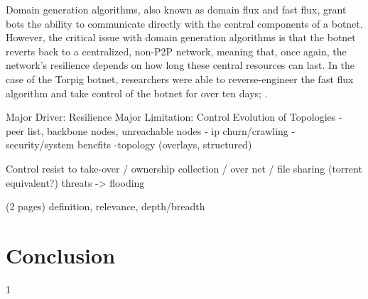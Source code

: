 \documentclass{acm_proc_article-sp}
\begin{document}
Domain generation algorithms, also known as domain flux and fast flux, grant bots the ability to communicate directly with the central components of a botnet.  However, the critical issue with domain generation algorithms is that the botnet reverts back to a centralized, non-P2P network, meaning that, once again, the network’s resilience depends on how long these central resources can last.  In the case of the Torpig botnet, researchers were able to reverse-engineer the fast flux algorithm and take control of the botnet for over ten days; \cite{stone:takeover}.




Major Driver: Resilience
Major Limitation: Control
Evolution of Topologies
    - peer list, backbone nodes, unreachable nodes
    - ip churn/crawling
    - security/system benefits
    -topology (overlays, structured)


Control
resist to take-over / ownership
collection / 
over net / file sharing (torrent equivalent?)
threats -> flooding

(2 pages)
definition, relevance, depth/breadth


\section{Conclusion}


1


\printbibliography{}
\end{document}
